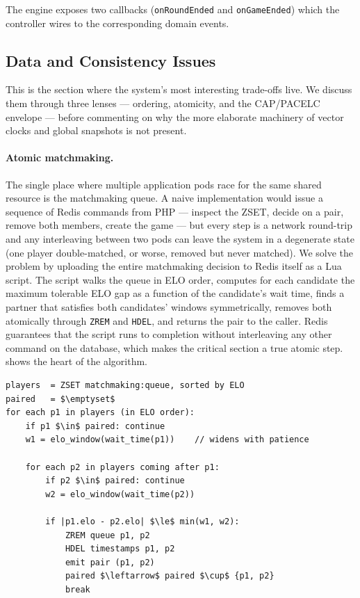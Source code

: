 \documentclass{scrartcl}
\begin{document}
The engine exposes two callbacks (\texttt{onRoundEnded} and
\texttt{onGameEnded}) which the controller wires to the corresponding
domain events. 

\subsection{Data and Consistency Issues}\label{data-and-consistency-issues}

This is the section where the system's most interesting trade-offs
live. We discuss them through three lenses --- ordering, atomicity, and
the CAP/PACELC envelope --- before commenting on why the more elaborate
machinery of vector clocks and global snapshots is not present.


\paragraph{Atomic matchmaking.} The single place where multiple
application pods race for the same shared resource is the matchmaking
queue. A naive implementation would issue a sequence of Redis commands
from PHP --- inspect the ZSET, decide on a pair, remove both members,
create the game --- but every step is a network round-trip and any
interleaving between two pods can leave the system in a degenerate
state (one player double-matched, or worse, removed but never matched).
We solve the problem by uploading the entire matchmaking decision to
Redis itself as a Lua script. The script walks the queue in ELO order,
computes for each candidate the maximum tolerable ELO gap as a
function of the candidate's wait time, finds a partner that satisfies
both candidates' windows symmetrically, removes both atomically through
\texttt{ZREM} and \texttt{HDEL}, and returns the pair to the caller.
Redis guarantees that the script runs to completion without
interleaving any other command on the database, which makes the
critical section a true atomic step.  shows
the heart of the algorithm.

\begin{lstlisting}[language={},mathescape=true,caption={Atomic
matchmaking section, shown as pseudocode. The real implementation runs
server-side inside Redis as a single Lua script, which by Redis'
execution model is guaranteed to run to completion without
interleaving any other command --- this is what makes the critical
section a true atomic step regardless of how many application pods
race for the same queue.},label={lst:lua-matchmaker}]
players  = ZSET matchmaking:queue, sorted by ELO
paired   = $\emptyset$
for each p1 in players (in ELO order):
    if p1 $\in$ paired: continue
    w1 = elo_window(wait_time(p1))    // widens with patience

    for each p2 in players coming after p1:
        if p2 $\in$ paired: continue
        w2 = elo_window(wait_time(p2))

        if |p1.elo - p2.elo| $\le$ min(w1, w2):
            ZREM queue p1, p2
            HDEL timestamps p1, p2
            emit pair (p1, p2)
            paired $\leftarrow$ paired $\cup$ {p1, p2}
            break
\end{lstlisting}
\end{document}
